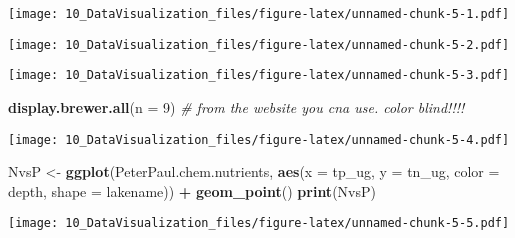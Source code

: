 \documentclass[]{article}
\newenvironment{Shaded}{\begin{snugshade}}{\end{snugshade}}
\newcommand{\KeywordTok}[1]{\textcolor[rgb]{0.13,0.29,0.53}{\textbf{#1}}}
\newcommand{\DataTypeTok}[1]{\textcolor[rgb]{0.13,0.29,0.53}{#1}}
\newcommand{\DecValTok}[1]{\textcolor[rgb]{0.00,0.00,0.81}{#1}}
\newcommand{\StringTok}[1]{\textcolor[rgb]{0.31,0.60,0.02}{#1}}
\newcommand{\CommentTok}[1]{\textcolor[rgb]{0.56,0.35,0.01}{\textit{#1}}}
\newcommand{\OperatorTok}[1]{\textcolor[rgb]{0.81,0.36,0.00}{\textbf{#1}}}
\newcommand{\NormalTok}[1]{#1}
\begin{document}
\texttt{[image: 10\_DataVisualization\_files/figure-latex/unnamed-chunk-5-1.pdf]}

\begin{Shaded}
\end{Shaded}

\texttt{[image: 10\_DataVisualization\_files/figure-latex/unnamed-chunk-5-2.pdf]}

\begin{Shaded}
\end{Shaded}

\texttt{[image: 10\_DataVisualization\_files/figure-latex/unnamed-chunk-5-3.pdf]}

\begin{Shaded}
\begin{Highlighting}[]
\KeywordTok{display.brewer.all}\NormalTok{(}\DataTypeTok{n =} \DecValTok{9}\NormalTok{) }\CommentTok{# from the website you cna use. color blind!!!!}
\end{Highlighting}
\end{Shaded}

\texttt{[image: 10\_DataVisualization\_files/figure-latex/unnamed-chunk-5-4.pdf]}

\begin{Shaded}
\begin{Highlighting}[]
\NormalTok{NvsP <-}
\StringTok{  }\KeywordTok{ggplot}\NormalTok{(PeterPaul.chem.nutrients, }\KeywordTok{aes}\NormalTok{(}\DataTypeTok{x =}\NormalTok{ tp_ug, }\DataTypeTok{y =}\NormalTok{ tn_ug, }\DataTypeTok{color =}\NormalTok{ depth, }\DataTypeTok{shape =}\NormalTok{ lakename)) }\OperatorTok{+}
\StringTok{  }\KeywordTok{geom_point}\NormalTok{() }
\KeywordTok{print}\NormalTok{(NvsP)}
\end{Highlighting}
\end{Shaded}

\texttt{[image: 10\_DataVisualization\_files/figure-latex/unnamed-chunk-5-5.pdf]}
\end{document}
